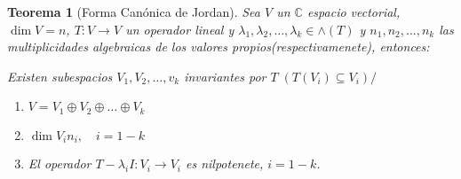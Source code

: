 \documentclass[10pt,a4paper]{article}
\newtheorem{mytheo}{Teorema}
\begin{document}
\begin{mytheo}[Forma Canónica de Jordan]
	Sea $V$ un $\mathbb{C}$ espacio vectorial, $\dim V = n$, $T:V\rightarrow V$ un operador lineal y $\lambda_{1},\lambda_{2},\ldots,\lambda_{k}\in \wedge (T)$ y $n_{1}, n_{2},\ldots , n_{k}$ las multiplicidades algebraicas de los valores propios(respectivamenete), entonces:

Existen subespacios $V_{1}, V_{2},\ldots, v_{k}$ invariantes por $T\;\left(T(V_{i})\subseteq V_{i}\right)/$
\begin{enumerate}
	\item	$V = V_{1}\oplus V_{2}\oplus\ldots\oplus V_{k}$
	\item $\dim V_{i} n_{i},\quad i=1-k$
	\item El operador $T-\lambda_{i}I:V_{i}\rightarrow V_{i}$ es nilpotenete, $i=1-k$.
\end{enumerate}
\end{mytheo}
\end{document}
